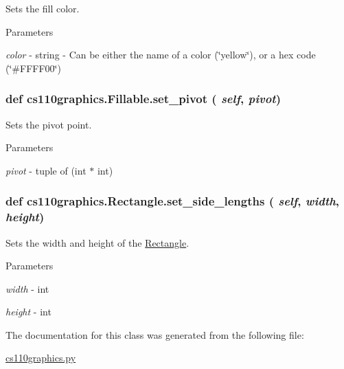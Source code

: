 Sets the fill color. 
\begin{DoxyParams}{Parameters}
\item[{\em color}]-\/ string -\/ Can be either the name of a color (\char`\"{}yellow\char`\"{}), or a hex code (\char`\"{}\#FFFF00\char`\"{}) \end{DoxyParams}
\hypertarget{classcs110graphics_1_1Fillable_a2a6066d1a11c0854ff5ee85e7d9ceb54}{
\subsubsection[{set\_\-pivot}]{\setlength{\rightskip}{0pt plus 5cm}def cs110graphics.Fillable.set\_\-pivot ( {\em self}, \/   {\em pivot})}}
\label{classcs110graphics_1_1Fillable_a2a6066d1a11c0854ff5ee85e7d9ceb54}


Sets the pivot point. 
\begin{DoxyParams}{Parameters}
\item[{\em pivot}]-\/ tuple of (int $\ast$ int) \end{DoxyParams}
\hypertarget{classcs110graphics_1_1Rectangle_a080e6851b24278d7533e0fa9920ea036}{
\subsubsection[{set\_\-side\_\-lengths}]{\setlength{\rightskip}{0pt plus 5cm}def cs110graphics.Rectangle.set\_\-side\_\-lengths ( {\em self}, \/   {\em width}, \/   {\em height})}}
\label{classcs110graphics_1_1Rectangle_a080e6851b24278d7533e0fa9920ea036}


Sets the width and height of the \hyperlink{classcs110graphics_1_1Rectangle}{Rectangle}. 
\begin{DoxyParams}{Parameters}
\item[{\em width}]-\/ int \item[{\em height}]-\/ int \end{DoxyParams}


The documentation for this class was generated from the following file:\begin{DoxyCompactItemize}
\item 
\hyperlink{cs110graphics_8py}{cs110graphics.py}\end{DoxyCompactItemize}
